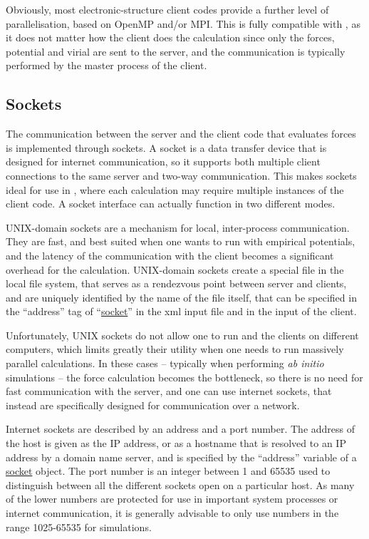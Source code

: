 \documentclass[11pt,english,fleqn]{report}
\begin{document}
Obviously, most electronic-structure client codes provide a further level
of parallelisation, based on OpenMP and/or MPI. This is fully compatible with
\ipi, as it does not matter how the client does the calculation since
only the forces, potential and virial are sent to the server, and the communication
is typically performed by the master process of the client.


\subsection{Sockets} \label{sockets}

The communication between the \ipi server and the client code that
evaluates forces is implemented through sockets. A socket is a
data transfer device that is designed for internet communication,
so it supports both multiple client connections to the same server and
two-way communication. This makes sockets ideal for use in \ipi,
where each calculation may require multiple instances of the client code.
A socket interface can actually function in two different modes.

UNIX-domain sockets are a mechanism for local, inter-process
communication. They are fast, and best suited when one wants
to run \ipi  with empirical potentials, and the latency of the
communication with the client becomes a significant overhead
for the calculation. UNIX-domain sockets create a special file
in the local file system, that serves as a rendezvous point
between server and clients, and are uniquely identified by the
name of the file itself, that can be specified in the ``address'' tag of
``\hyperref[FFSOCKET]{socket}'' in the xml input file and in
the input of the client.

Unfortunately, UNIX sockets do not allow one to run \ipi{} and
the clients on different computers, which limits greatly their
utility when  one needs to run massively parallel calculations.
In these cases -- typically when performing \emph{ab initio}
simulations -- the force calculation becomes the bottleneck, so there is no
need for fast communication with the server, and one can
use internet sockets, that instead are specifically designed
for communication over a network.

Internet sockets are described by an address and a port number.
The address of the host is given as the IP address,
or as a hostname that is resolved to an IP address by a domain name server,
and is specified by the {}``address'' variable of a
\hyperref[FFSOCKET]{socket} object.
The port number is an integer between 1 and 65535 used to distinguish
between all the different sockets open on a particular host. As
many of the lower numbers are protected for use in important system
processes or internet communication, it is generally advisable to
only use numbers in the range 1025-65535 for simulations.
\end{document}
